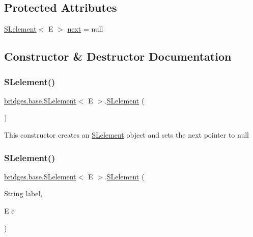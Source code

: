 \subsection*{Protected Attributes}
\begin{DoxyCompactItemize}
\item 
\mbox{\hyperlink{classbridges_1_1base_1_1_s_lelement}{S\+Lelement}}$<$ E $>$ \mbox{\hyperlink{classbridges_1_1base_1_1_s_lelement_abf61c96a74ad319d561c6952ea388e0e}{next}} = null
\end{DoxyCompactItemize}


\subsection{Constructor \& Destructor Documentation}
\mbox{\label{classbridges_1_1base_1_1_s_lelement_ab9c8a08dadd76d7e0c29d7c41cf277c4}} 
\subsubsection{\texorpdfstring{SLelement()}{SLelement()}\hspace{0.1cm}{\footnotesize\ttfamily [1/5]}}
{\footnotesize\ttfamily \mbox{\hyperlink{classbridges_1_1base_1_1_s_lelement}{bridges.\+base.\+S\+Lelement}}$<$ E $>$.\mbox{\hyperlink{classbridges_1_1base_1_1_s_lelement}{S\+Lelement}} (\begin{DoxyParamCaption}{ }\end{DoxyParamCaption})}

This constructor creates an \mbox{\hyperlink{classbridges_1_1base_1_1_s_lelement}{S\+Lelement}} object and sets the next pointer to null \mbox{\label{classbridges_1_1base_1_1_s_lelement_a8e32c9b9e8fc8f9f1eccb14b97e031e7}} 
\subsubsection{\texorpdfstring{SLelement()}{SLelement()}\hspace{0.1cm}{\footnotesize\ttfamily [2/5]}}
{\footnotesize\ttfamily \mbox{\hyperlink{classbridges_1_1base_1_1_s_lelement}{bridges.\+base.\+S\+Lelement}}$<$ E $>$.\mbox{\hyperlink{classbridges_1_1base_1_1_s_lelement}{S\+Lelement}} (\begin{DoxyParamCaption}\item[{String}]{label,  }\item[{E}]{e }\end{DoxyParamCaption})}

